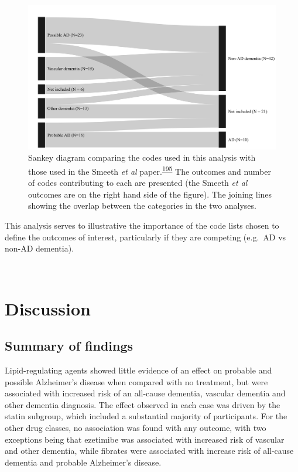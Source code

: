 \documentclass[a4paper, twoside]{templates/ociamthesis}
\begin{document}
~





\begin{figure}[H]
\includegraphics[width=1\linewidth]{figures/cprd-analysis/sankey_diagram} \caption[Comparison of code used in this analysis with those used in the Smeeth et al.~2010 paper]{Sankey diagram comparing the codes used in this analysis with those used in the Smeeth \emph{et al} paper.\textsuperscript{\protect\hyperlink{ref-smeeth2009}{195}} The outcomes and number of codes contributing to each are presented (the Smeeth \emph{et al} outcomes are on the right hand side of the figure). The joining lines showing the overlap between the categories in the two analyses.}\label{fig:smeethComparison}
\end{figure}

This analysis serves to illustrative the importance of the code lists chosen to define the outcomes of interest, particularly if they are competing (e.g.~AD vs non-AD dementia).

~

\hypertarget{discussion-2}{%
\section{Discussion}\label{discussion-2}}

\hypertarget{summary-of-findings-1}{%
\subsection{Summary of findings}\label{summary-of-findings-1}}

Lipid-regulating agents showed little evidence of an effect on probable and possible Alzheimer's disease when compared with no treatment, but were associated with increased risk of an all-cause dementia, vascular dementia and other dementia diagnosis. The effect observed in each case was driven by the statin subgroup, which included a substantial majority of participants. For the other drug classes, no association was found with any outcome, with two exceptions being that ezetimibe was associated with increased risk of vascular and other dementia, while fibrates were associated with increase risk of all-cause dementia and probable Alzheimer's disease.
\end{document}

